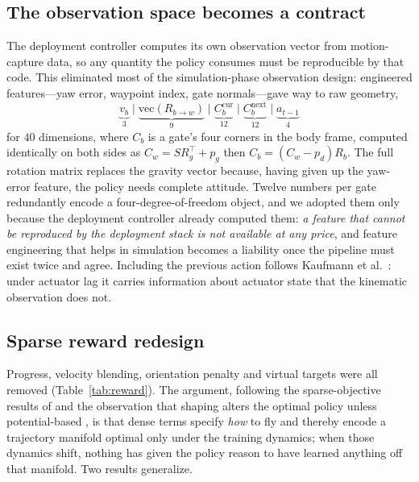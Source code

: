 \documentclass[10pt, twocolumn]{article}
\begin{document}
\subsection{The observation space becomes a contract}

The deployment controller computes its own observation vector from
motion-capture data, so any quantity the policy consumes must be reproducible
by that code. This eliminated most of the simulation-phase observation design:
engineered features---yaw error, waypoint index, gate normals---gave way to raw
geometry,
\begin{equation*}
\underbrace{v_b}_{3} \;\big|\;
\underbrace{\mathrm{vec}(R_{b \rightarrow w})}_{9} \;\big|\;
\underbrace{C^{\text{cur}}_b}_{12} \;\big|\;
\underbrace{C^{\text{next}}_b}_{12} \;\big|\;
\underbrace{a_{t-1}}_{4}
\end{equation*}
for $40$ dimensions, where $C_b$ is a gate's four corners in the body frame,
computed identically on both sides as $C_w = S R_g^\top + p_g$ then
$C_b = (C_w - p_d) R_b$. The full rotation matrix replaces the gravity vector
because, having given up the yaw-error feature, the policy needs complete
attitude. Twelve numbers per gate redundantly encode a four-degree-of-freedom
object, and we adopted them only because the deployment controller already
computed them: \emph{a feature that cannot be reproduced by the deployment
stack is not available at any price}, and feature engineering that helps in
simulation becomes a liability once the pipeline must exist twice and agree.
Including the previous action follows Kaufmann et al.\ \cite{kaufmann2023}:
under actuator lag it carries information about actuator state that the
kinematic observation does not.

\subsection{Sparse reward redesign}

Progress, velocity blending, orientation penalty and virtual targets were all
removed (Table~\ref{tab:reward}). The argument, following the sparse-objective
results of \cite{pasumarti2025} and the observation that shaping alters the
optimal policy unless potential-based \cite{ng1999}, is that dense terms
specify \emph{how} to fly and thereby encode a trajectory manifold optimal only
under the training dynamics; when those dynamics shift, nothing has given the
policy reason to have learned anything off that manifold. Two results
generalize.
\end{document}

